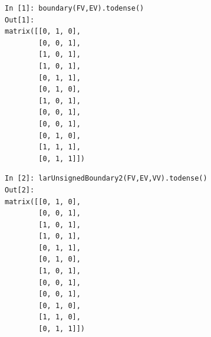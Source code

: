 \documentclass[11pt,oneside]{article}	%
\begin{document}
{\scriptsize
\begin{minipage}[c]{0.5\linewidth}
\centering
\begin{verbatim}
In [1]: boundary(FV,EV).todense()
Out[1]: 
matrix([[0, 1, 0],
        [0, 0, 1],
        [1, 0, 1],
        [1, 0, 1],
        [0, 1, 1],
        [0, 1, 0],
        [1, 0, 1],
        [0, 0, 1],
        [0, 0, 1],
        [0, 1, 0],
        [1, 1, 1],
        [0, 1, 1]])
\end{verbatim}
\end{minipage}
\begin{minipage}[c]{0.5\linewidth}
\centering
\begin{verbatim}
In [2]: larUnsignedBoundary2(FV,EV,VV).todense()
Out[2]: 
matrix([[0, 1, 0],
        [0, 0, 1],
        [1, 0, 1],
        [1, 0, 1],
        [0, 1, 1],
        [0, 1, 0],
        [1, 0, 1],
        [0, 0, 1],
        [0, 0, 1],
        [0, 1, 0],
        [1, 1, 0],
        [0, 1, 1]])
\end{verbatim}
\end{minipage}}
\end{document}
